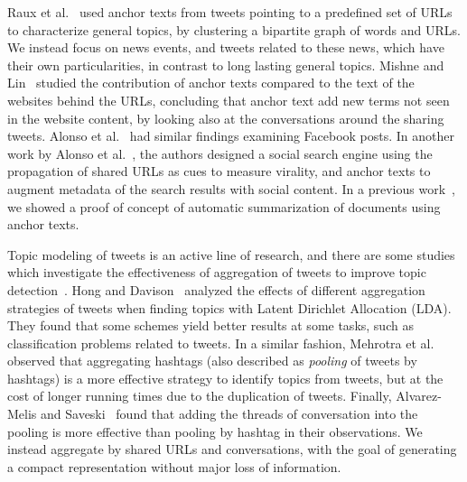 %
Raux et
al.~\cite{raux2011describing} used anchor texts from tweets pointing to a
predefined set of URLs to characterize general topics, by clustering a bipartite
graph of words and URLs. 
%
We instead focus on news events, and tweets related to these news, which have
their own particularities, in contrast to long lasting general topics. 
%
Mishne and Lin~\cite{mishne2012twanchor} studied the contribution of anchor
texts compared to the text of the websites behind the URLs, concluding that
anchor text add new terms not seen in the website content, by looking also at
the conversations around the sharing tweets. 
%
Alonso et al.~\cite{Alonso:2015:WCW:2740908.2745397} had similar findings
examining Facebook posts. 
%
In another work by Alonso et al.~\cite{Alonso:2017:WHH:3091478.3091484}, the
authors designed a social search engine using the propagation of shared URLs as
cues to measure virality, and anchor texts to augment metadata of the search
results with social content. 
%
In a previous work~\cite{quezada2013understanding}, we showed a proof of concept
of automatic summarization of documents using anchor texts.
%


Topic modeling of tweets is an active line of research, and there are some
studies which investigate the effectiveness of aggregation of tweets to improve
topic
detection~\cite{Hong:2010:EST:1964858.1964870,Mehrotra:2013:ILT:2484028.2484166,alvarez2016topic}.
Hong and Davison~\cite{Hong:2010:EST:1964858.1964870} analyzed the effects of
different aggregation strategies of tweets when finding topics with Latent
Dirichlet Allocation (LDA). 
%
They found that some schemes yield better results at some tasks, such as
classification problems related to tweets. 
%
In a similar fashion, Mehrotra et al.~\cite{Mehrotra:2013:ILT:2484028.2484166}
observed that aggregating hashtags (also described as {\em pooling} of tweets by
hashtags) is a more effective strategy to identify topics from tweets, but at
the cost of longer running times due to the duplication of tweets. 
%
Finally, Alvarez-Melis and Saveski~\cite{alvarez2016topic} found that adding the
threads of conversation into the pooling is more effective than pooling by
hashtag in their observations. 
%
We instead aggregate by shared URLs and conversations, with the goal of
generating a compact representation without major loss of information.




